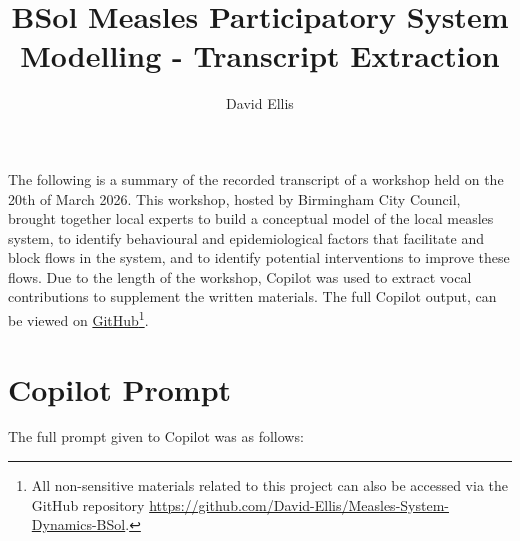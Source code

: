 \documentclass{article}
\title{BSol Measles Participatory System Modelling - Transcript Extraction}
\author{David Ellis}
\date{}
\begin{document}
\maketitle 

The following is a summary of the recorded transcript of a workshop held on the 20th of March 2026. This workshop, hosted by Birmingham City Council, brought together local experts to build a conceptual model of the local measles system, to identify behavioural and epidemiological factors that facilitate and block flows in the system, and to identify potential interventions to improve these flows.
Due to the length of the workshop, Copilot was used to extract vocal contributions to supplement the written materials. The full Copilot output, can be viewed on  \href{https://github.com/David-Ellis/Measles-System-Dynamics-BSol/blob/main/data/workshop/chronological_extraction_FULL.txt}{GitHub}\footnote{All non-sensitive materials related to this project can also be accessed via the GitHub repository \url{https://github.com/David-Ellis/Measles-System-Dynamics-BSol}.}. 

\section{Copilot Prompt}

The full prompt given to Copilot was as follows:
\end{document}
